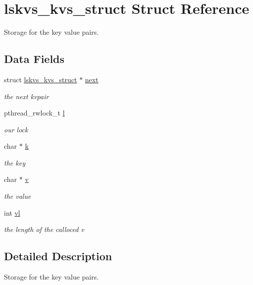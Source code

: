 \hypertarget{structlskvs__kvs__struct}{\section{lskvs\-\_\-kvs\-\_\-struct Struct Reference}
\label{structlskvs__kvs__struct}
}


Storage for the key value pairs.  


\subsection*{Data Fields}
\begin{DoxyCompactItemize}
\item 
struct \hyperlink{structlskvs__kvs__struct}{lskvs\-\_\-kvs\-\_\-struct} $\ast$ \hyperlink{structlskvs__kvs__struct_a6302f184418962708bd1efe3320d4347}{next}
\begin{DoxyCompactList}\small\item\em the next kvpair \end{DoxyCompactList}\item 
pthread\-\_\-rwlock\-\_\-t \hyperlink{structlskvs__kvs__struct_a45129c7f3d0bb2efc83b8a0d7ea2d814}{l}
\begin{DoxyCompactList}\small\item\em our lock \end{DoxyCompactList}\item 
char $\ast$ \hyperlink{structlskvs__kvs__struct_afaaab7729ce9dbabd8f3e2c502a8e4c5}{k}
\begin{DoxyCompactList}\small\item\em the key \end{DoxyCompactList}\item 
char $\ast$ \hyperlink{structlskvs__kvs__struct_a27a0ae4415b6d65c8a9f9fac11c130f9}{v}
\begin{DoxyCompactList}\small\item\em the value \end{DoxyCompactList}\item 
int \hyperlink{structlskvs__kvs__struct_aa1c980ae62cdf78d8b358b3a51deda6a}{vl}
\begin{DoxyCompactList}\small\item\em the length of the calloced v \end{DoxyCompactList}\end{DoxyCompactItemize}


\subsection{Detailed Description}
Storage for the key value pairs. 

